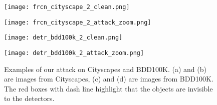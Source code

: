\documentclass[times,twocolumn,final,authoryear]{elsarticle}
\begin{document}
\begin{figure}[!t]
\centering
\begin{minipage}[]{.48\linewidth}
{               %
\texttt{[image: frcn\_cityscape\_2\_clean.png]}}
\end{minipage}
\hspace{0in}
\begin{minipage}[]{.48\linewidth}
{               %
\texttt{[image: frcn\_cityscape\_2\_attack\_zoom.png]}}
\end{minipage}
\begin{minipage}[]{.48\linewidth}
{               %
\texttt{[image: detr\_bdd100k\_2\_clean.png]}}
\end{minipage}
\hspace{0in}
\begin{minipage}[]{.48\linewidth}
{               %
\texttt{[image: detr\_bdd100k\_2\_attack\_zoom.png]}}
\end{minipage}
\caption{Examples of our attack on Cityscapes and BDD100K.
(a) and (b) are images from Cityscapes, (c) and (d) are images from BDD100K. The red boxes with dash line highlight that the objects are invisible to the detectors.
}
\label{fig:auto-driving}
\end{figure}
\end{document}
